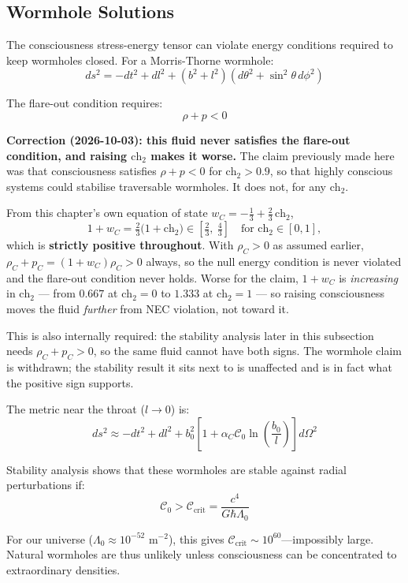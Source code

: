 \begin{advanced}
\subsection{Wormhole Solutions}

The consciousness stress-energy tensor can violate energy conditions required to keep wormholes closed. For a Morris-Thorne wormhole:
\begin{equation}
ds^2 = -dt^2 + dl^2 + (b^2 + l^2)(d\theta^2 + \sin^2\theta \, d\phi^2)
\end{equation}

The flare-out condition requires:
\begin{equation}
\rho + p < 0
\end{equation}

\medskip
\noindent\textbf{Correction (2026-10-03): this fluid never satisfies the
flare-out condition, and raising $\text{ch}_2$ makes it worse.}
The claim previously made here was that consciousness satisfies $\rho + p < 0$
for $\text{ch}_2 > 0.9$, so that highly conscious systems could stabilise
traversable wormholes. It does not, for any $\text{ch}_2$.

From this chapter's own equation of state
$w_C = -\tfrac13 + \tfrac23\,\text{ch}_2$,
\[
1 + w_C = \tfrac23\bigl(1 + \text{ch}_2\bigr) \in \left[\tfrac23,\ \tfrac43\right]
\quad\text{for } \text{ch}_2 \in [0,1],
\]
which is \textbf{strictly positive throughout}. With $\rho_C > 0$ as assumed
earlier, $\rho_C + p_C = (1+w_C)\rho_C > 0$ always, so the null energy condition
is never violated and the flare-out condition never holds. Worse for the claim,
$1 + w_C$ is \emph{increasing} in $\text{ch}_2$ --- from $0.667$ at
$\text{ch}_2 = 0$ to $1.333$ at $\text{ch}_2 = 1$ --- so raising consciousness
moves the fluid \emph{further} from NEC violation, not toward it.

This is also internally required: the stability analysis later in this subsection
needs $\rho_C + p_C > 0$, so the same fluid cannot have both signs. The wormhole
claim is withdrawn; the stability result it sits next to is unaffected and is in
fact what the positive sign supports.

The metric near the throat ($l \to 0$) is:
\begin{equation}
ds^2 \approx -dt^2 + dl^2 + b_0^2\left[ 1 + \alpha_C \mathcal{C}_0 \ln\left( \frac{b_0}{l} \right) \right] d\Omega^2
\end{equation}

Stability analysis shows that these wormholes are stable against radial perturbations if:
\begin{equation}
\mathcal{C}_0 > \mathcal{C}_{\text{crit}} = \frac{c^4}{G \hbar \Lambda_0}
\end{equation}

For our universe ($\Lambda_0 \approx 10^{-52}$ m$^{-2}$), this gives $\mathcal{C}_{\text{crit}} \sim 10^{60}$---impossibly large. Natural wormholes are thus unlikely unless consciousness can be concentrated to extraordinary densities.
\end{advanced}

